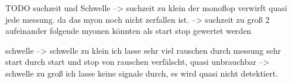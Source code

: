 TODO suchzeit und Schwelle
--> suchzeit zu klein der monoflop verwirft quasi jede messung. da das myon noch nicht zerfallen ist.
--> suchzeit zu groß 2 aufeinander folgende myonen könnten als start stop gewertet werden 

schwelle
--> schwelle zu klein ich lasse sehr viel rauschen durch messung sehr start durch start und stop von rauschen
verfälscht, quasi unbrauchbar
--> schwelle zu groß ich lasse keine signale durch, es wird quasi nicht detektiert.

\nocite{*}
\printbibliography{}

%
